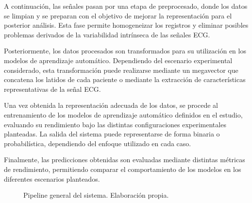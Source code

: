 \documentclass[12pt,a4paper,twoside]{book}
\begin{document}
A continuación, las señales pasan por una etapa de preprocesado, donde los datos se limpian y se preparan con el objetivo de mejorar la representación para el posterior análisis.
Esta fase permite homogeneizar los registros y eliminar posibles problemas derivados de la variabilidad intrínseca de las señales ECG.

Posteriormente, los datos procesados son transformados para su utilización en los modelos de aprendizaje automático. 
Dependiendo del escenario experimental considerado, esta transformación puede realizarse mediante un megavector que concatena los latidos de cada paciente o mediante la extracción de características representativas de la señal ECG.

Una vez obtenida la representación adecuada de los datos, se procede al entrenamiento de los modelos de aprendizaje automático definidos en el estudio, evaluando su rendimiento bajo las distintas configuraciones experimentales planteadas.
La salida del sistema puede representarse de forma binaria o probabilística, dependiendo del enfoque utilizado en cada caso.

Finalmente, las predicciones obtenidas son evaluadas mediante distintas métricas de rendimiento, permitiendo comparar el comportamiento de los modelos en los diferentes escenarios planteados.

\begin{figure}[H]

\caption{Pipeline general del sistema. Elaboración propia.}
\label{fig:arquitectura_sistema}

\end{figure}
\end{document}
